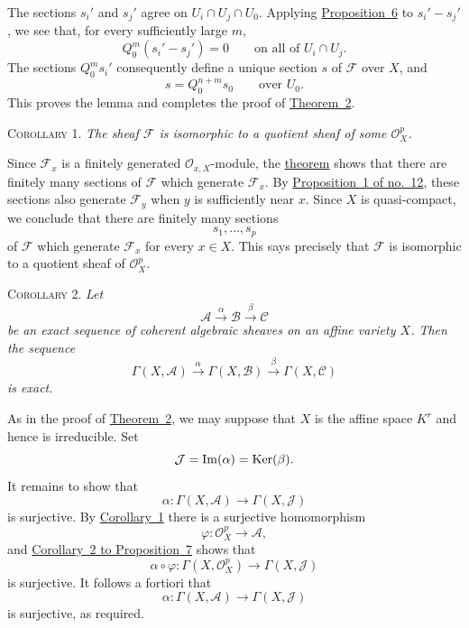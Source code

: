 The sections $s_i'$ and $s_j'$ agree on $U_i\cap U_j\cap U_0$. Applying \hyperref[fac:II:3:no:43:prop:6]{Proposition~6} to $s_i'-s_j'$, we see that, for every sufficiently large $m$,
\[
Q_0^m(s_i'-s_j')=0
\qquad\text{on all of }U_i\cap U_j.
\]
The sections $Q_0^m s_i'$ consequently define a unique section $s$ of $\mathcal{F}$ over $X$, and
\[
s=Q_0^{n+m}s_0
\qquad\text{over }U_0.
\]
This proves the lemma and completes the proof of \hyperref[fac:II:3:no:45:thm:2]{Theorem~2}.

\label{fac:II:3:no:45:thm:2:cor:1}
\textsc{Corollary 1.} \textit{The sheaf $\mathcal{F}$ is isomorphic to a quotient sheaf of some $\mathcal{O}_X^p$.}

Since $\mathcal{F}_x$ is a finitely generated $\mathcal{O}_{x,X}$-module, the \hyperref[fac:II:3:no:45:thm:2]{theorem} shows that there are finitely many sections of $\mathcal{F}$ which generate $\mathcal{F}_x$. By \hyperref[fac:I:2:no:12:prop:1]{Proposition~1 of no.~12}, these sections also generate $\mathcal{F}_y$ when $y$ is sufficiently near $x$. Since $X$ is quasi-compact, we conclude that there are finitely many sections
\[
s_1,\ldots,s_p
\]
of $\mathcal{F}$ which generate $\mathcal{F}_x$ for every $x\in X$. This says precisely that $\mathcal{F}$ is isomorphic to a quotient sheaf of $\mathcal{O}_X^p$.

\label{fac:II:3:no:45:thm:2:cor:2}
\textsc{Corollary 2.} \textit{Let}
\[
\mathcal{A}\xrightarrow{\ \alpha\ }\mathcal{B}
\xrightarrow{\ \beta\ }\mathcal{C}
\]
\textit{be an exact sequence of coherent algebraic sheaves on an affine variety $X$. Then the sequence}
\[
\Gamma(X,\mathcal{A})\xrightarrow{\ \alpha\ }
\Gamma(X,\mathcal{B})\xrightarrow{\ \beta\ }
\Gamma(X,\mathcal{C})
\]
\textit{is exact.}

As in the proof of \hyperref[fac:II:3:no:45:thm:2]{Theorem~2}, we may suppose that $X$ is the affine space $K^r$ and hence is irreducible. Set
\[
\mathcal{J}=\operatorname{Im}(\alpha)=\operatorname{Ker}(\beta).
\]
It remains to show that
\[
\alpha:\Gamma(X,\mathcal{A})\longrightarrow\Gamma(X,\mathcal{J})
\]
is surjective. By \hyperref[fac:II:3:no:45:thm:2:cor:1]{Corollary~1} there is a surjective homomorphism
\[
\varphi:\mathcal{O}_X^p\longrightarrow\mathcal{A},
\]
and \hyperref[fac:II:3:no:44:prop:7:cor:2]{Corollary~2 to Proposition~7} shows that
\[
\alpha\circ\varphi:
\Gamma(X,\mathcal{O}_X^p)\longrightarrow\Gamma(X,\mathcal{J})
\]
is surjective. It follows a fortiori that
\[
\alpha:\Gamma(X,\mathcal{A})\longrightarrow\Gamma(X,\mathcal{J})
\]
is surjective, as required.
